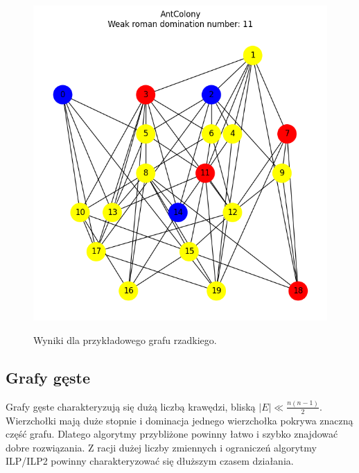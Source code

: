 \begin{figure}[H]
\begin{subcaptionbox}
            {\includegraphics[width=0.75\linewidth]{assets/plots/AntColony/ErdosRenyi_sparse_n20_i2_results.png}}
        \end{subcaptionbox}
    
        \caption{Wyniki dla przykładowego grafu rzadkiego.}
        \label{fig:sparse}
    \end{figure}

\subsection{Grafy gęste}

Grafy gęste charakteryzują się dużą liczbą krawędzi, bliską $|E| \ll \frac{n(n - 1)}{2}$. Wierzchołki mają duże stopnie i dominacja jednego wierzchołka pokrywa znaczną część grafu. Dlatego algorytmy przybliżone powinny łatwo i szybko znajdować dobre rozwiązania. Z racji dużej liczby zmiennych i ograniczeń algorytmy ILP/ILP2 powinny charakteryzować się dłuższym czasem działania.

